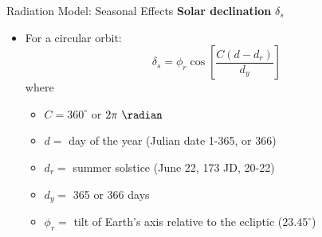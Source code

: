\begin{frame}{Radiation Model: Seasonal Effects}
\textbf{Solar declination} $\delta_s$
\begin{itemize}
	\item For a circular orbit:
	$$\delta_s = \phi_r \cos \left[\frac{C(d-d_r)}{d_y}\right]$$
	where
	\begin{itemize}
		\item $C=360^\circ$ or $2\pi\ \radian$
		\item $d =$ day of the year (Julian date 1-365, or 366)
		\item $d_r =$ summer solstice (June 22, 173 JD, 20-22)
		\item $d_y =$ 365 or 366 days
		\item $\phi_r =$ tilt of Earth's axis relative to the ecliptic ($23.45^\circ$)
	\end{itemize}
\end{itemize}
\end{frame}
